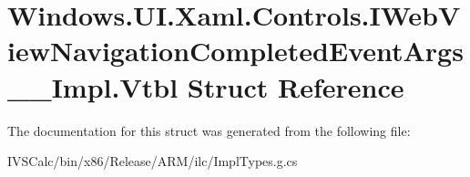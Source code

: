 \hypertarget{struct_windows_1_1_u_i_1_1_xaml_1_1_controls_1_1_i_web_view_navigation_completed_event_args_____impl_1_1_vtbl}{}\section{Windows.\+U\+I.\+Xaml.\+Controls.\+I\+Web\+View\+Navigation\+Completed\+Event\+Args\+\_\+\+\_\+\+Impl.\+Vtbl Struct Reference}
\label{struct_windows_1_1_u_i_1_1_xaml_1_1_controls_1_1_i_web_view_navigation_completed_event_args_____impl_1_1_vtbl}


The documentation for this struct was generated from the following file\+:\begin{DoxyCompactItemize}
\item 
I\+V\+S\+Calc/bin/x86/\+Release/\+A\+R\+M/ilc/Impl\+Types.\+g.\+cs\end{DoxyCompactItemize}
